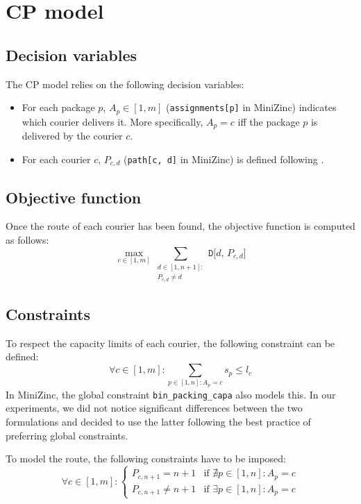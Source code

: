\section{CP model}


\subsection{Decision variables}

The CP model relies on the following decision variables:
\begin{itemize}
    \item For each package $p$, $A_p \in [1, m]$ (\texttt{assignments[p]} in MiniZinc) indicates which courier delivers it. More specifically, $A_p = c$ iff the package $p$ is delivered by the courier $c$.
    
    \item For each courier $c$, $P_{c, d}$ (\texttt{path[c, d]} in MiniZinc) is defined following .
\end{itemize}



\subsection{Objective function}
Once the route of each courier has been found, the objective function is computed as follows:
\begin{equation}
    \max_{c \in [1, m]} \sum_{\substack{d \in [1, n+1]:\\P_{c, d} \neq d}} \texttt{D[$d$, $P_{c, d}$]} 
\end{equation}


\subsection{Constraints}

To respect the capacity limits of each courier, the following constraint can be defined:
\begin{equation}
    \forall c \in [1, m]: \sum_{p \in [1, n]: A_p = c} s_p \leq l_c 
\end{equation}
In MiniZinc, the global constraint \texttt{bin\_packing\_capa} also models this. In our experiments, we did not notice significant differences between the two formulations and decided to use the latter following the best practice of preferring global constraints.

To model the route, the following constraints have to be imposed:
\begin{equation}
    \label{eq:cp_constr_route_depot}
    \forall c \in [1, m]: 
    \begin{cases}
        P_{c, n+1} = n+1    & \text{if $\nexists p \in [1, n]: A_p = c$} \\ 
        P_{c, n+1} \neq n+1 & \text{if $\exists p \in [1, n]: A_p = c$} 
    \end{cases}
\end{equation}

